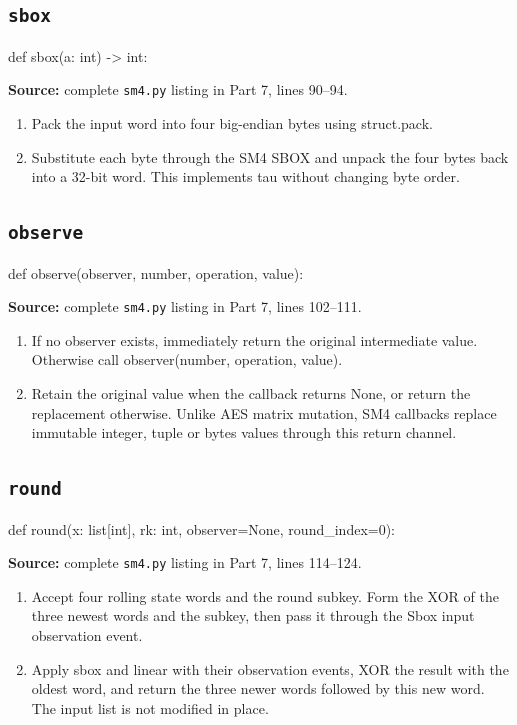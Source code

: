 \subsection{\texttt{sbox}}
\begin{lightcode}
def sbox(a: int) -> int:
\end{lightcode}
\noindent\textbf{Source:} complete \texttt{sm4.py} listing in Part 7, lines 90--94.
\begin{enumerate}
\item Pack the input word into four big-endian bytes using struct.pack.
\item Substitute each byte through the SM4 SBOX and unpack the four bytes back into a 32-bit word. This implements tau without changing byte order.
\end{enumerate}
\subsection{\texttt{observe}}
\begin{lightcode}
def observe(observer, number, operation, value):
\end{lightcode}
\noindent\textbf{Source:} complete \texttt{sm4.py} listing in Part 7, lines 102--111.
\begin{enumerate}
\item If no observer exists, immediately return the original intermediate value. Otherwise call observer(number, operation, value).
\item Retain the original value when the callback returns None, or return the replacement otherwise. Unlike AES matrix mutation, SM4 callbacks replace immutable integer, tuple or bytes values through this return channel.
\end{enumerate}
\subsection{\texttt{round}}
\begin{lightcode}
def round(x: list[int], rk: int, observer=None, round_index=0):
\end{lightcode}
\noindent\textbf{Source:} complete \texttt{sm4.py} listing in Part 7, lines 114--124.
\begin{enumerate}
\item Accept four rolling state words and the round subkey. Form the XOR of the three newest words and the subkey, then pass it through the Sbox input observation event.
\item Apply sbox and linear with their observation events, XOR the result with the oldest word, and return the three newer words followed by this new word. The input list is not modified in place.
\end{enumerate}
